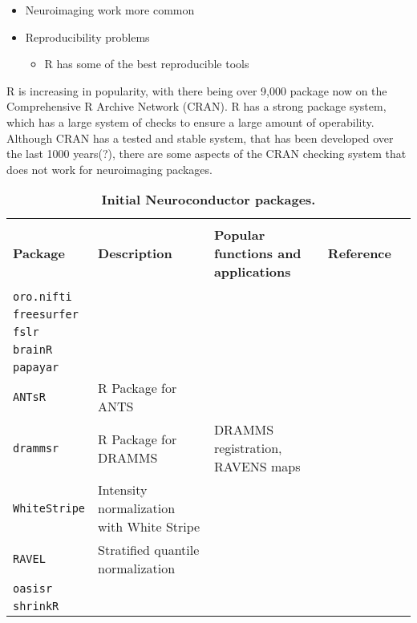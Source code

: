 \documentclass[]{elsarticle} %
\providecommand{\tightlist}{%
  \setlength{\itemsep}{0pt}\setlength{\parskip}{0pt}}
\begin{document}
\begin{itemize}
\tightlist
\item
  Neuroimaging work more common
\item
  Reproducibility problems

  \begin{itemize}
  \tightlist
  \item
    R has some of the best reproducible tools
  \end{itemize}
\end{itemize}

R is increasing in popularity, with there being over 9,000 package now
on the Comprehensive R Archive Network (CRAN). R has a strong package
system, which has a large system of checks to ensure a large amount of
operability. Although CRAN has a tested and stable system, that has been
developed over the last 1000 years(?), there are some aspects of the
CRAN checking system that does not work for neuroimaging packages.

\begin{table}[!ht]
\footnotesize
\centering
\caption{\textbf{Initial Neuroconductor packages.}}\label{tab:summary}
\begin{tabular}{lllcl}
\hline \\[-2ex]
\textbf{Package} & \textbf{Description} & \textbf{Popular functions and applications} & \textbf{Reference} \\
\hline \\ [-1.5ex]
\texttt{oro.nifti} &  &  & &   \\ [1ex]
\texttt{freesurfer} & &  & \\ [1ex]
 \texttt{fslr} &  & &   \\ [1ex]
 \texttt{brainR} &  &  &    \\ [1ex]
 \texttt{papayar} &  &  &    \\ [1ex]
   \texttt{ANTsR} & R Package for ANTS &   \\ [1ex]
  \texttt{drammsr} & R Package for DRAMMS & 
  DRAMMS registration, RAVENS maps  \\ [1ex]
 \texttt{WhiteStripe} & Intensity normalization with White Stripe & & &   \\ [1ex]
   \texttt{RAVEL} & Stratified quantile normalization &&&  \\ [1ex]
     \texttt{oasisr} &  &&&  \\ [1ex]
     \texttt{shrinkR} &  &&&  \\ [1ex]
\hline
\end{tabular}
\end{table}
\end{document}

